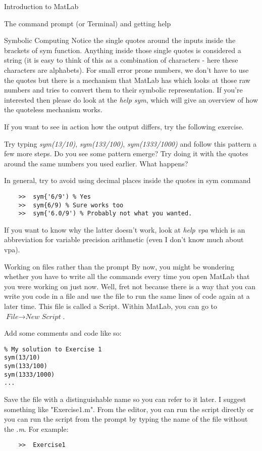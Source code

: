 \documentclass[11pt, oneside]{report}   	%
\begin{document}
\begin{chapter}{Introduction to MatLab}
\begin{section}{The command prompt (or Terminal) and getting help}
\begin{subsection}{Symbolic Computing}
Notice the single quotes around the inputs inside the brackets of sym function. Anything inside those single quotes
is considered a string (it is easy to think of this as a combination of characters - here these characters are
alphabets). For small error prone numbers, we don't have to use the quotes but there is a mechanism that MatLab
has which looks at those raw numbers and tries to convert them to their symbolic representation. If you're
interested then please do look at the \textit{help sym}, which will give an overview of how the quoteless mechanism
works.

If you want to see in action how the output differs, try the following exercise.
\begin{Exercise}
Try typing \textit{sym(13/10)}, \textit{sym(133/100)}, \textit{sym(1333/1000)} and follow this pattern a few more
steps. Do you see some pattern emerge? Try doing it with the quotes around the same numbers you used earlier.
What happens?
\end{Exercise}

In general, try to avoid using decimal places inside the quotes in sym command

\begin{lstlisting}
	>>	sym{'6/9') % Yes
	>>	sym{6/9) % Sure works too
	>>	sym{'6.0/9') % Probably not what you wanted. 

\end{lstlisting}

If you want to know why the latter doesn't work, look at \textit{help vpa} which is an abbreviation for variable
precision arithmetic (even I don't know much about vpa).

\end{subsection}

\begin{subsection}{Working on files rather than the prompt}
By now, you might be wondering whether you have to write all the commands every time you open MatLab that you
were working on just now. Well, fret not because there is a way that you can write you code in a file and use the file
to run the same lines of code again at a later time. This file is called a Script. Within MatLab, you can go to 
$\textit{File} \rightarrow \textit{New Script}$.

Add some comments and code like so:

\begin{lstlisting}
% My solution to Exercise 1
sym(13/10)
sym(133/100)
sym(1333/1000)
...
\end{lstlisting} 
Save the file with a distinguishable name so you can refer to it later. I suggest something like "Exercise1.m". From
the editor, you can run the script directly or you can run the script from the prompt by typing the name of the file
without the \textit{.m}. For example:
\begin{lstlisting}
	>>	Exercise1 
\end{lstlisting}


\end{subsection}
\end{section}
\end{chapter}
\end{document}
